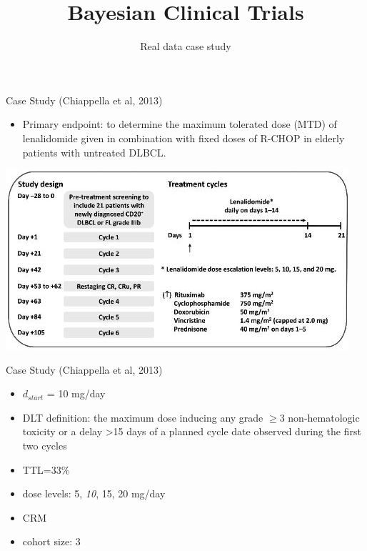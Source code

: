 \documentclass{beamer}
\title[]{Bayesian Clinical Trials}
\subtitle{Real data case study}
\date{}
\begin{document}
\begin{frame}
\titlepage %
\end{frame}

\begin{frame}{Case Study (Chiappella et al, 2013)}

\begin{itemize}
\itemsep1pt\parskip0pt
\item
  Primary endpoint: to determine the maximum tolerated dose (MTD) of
  lenalidomide given in combination with fixed doses of R-CHOP in
  elderly patients with untreated DLBCL.
\end{itemize}

\begin{center}
\includegraphics[scale=1.8]{images/figure1.jpg}
\end{center}


\end{frame}

\begin{frame}{Case Study (Chiappella et al, 2013)}

\begin{itemize}
\item
  $d_{start}$ = 10 mg/day
\item
  DLT definition: the maximum dose inducing any grade $\ge 3$
  non-hematologic toxicity or a delay \textgreater{}15 days of a planned
  cycle date observed during the first two cycles
\item
  TTL=33\%
\item
  dose levels: 5, \emph{10}, 15, 20 mg/day
\item
  CRM
\item
  cohort size: 3
\end{itemize}

\end{frame}
\end{document}
